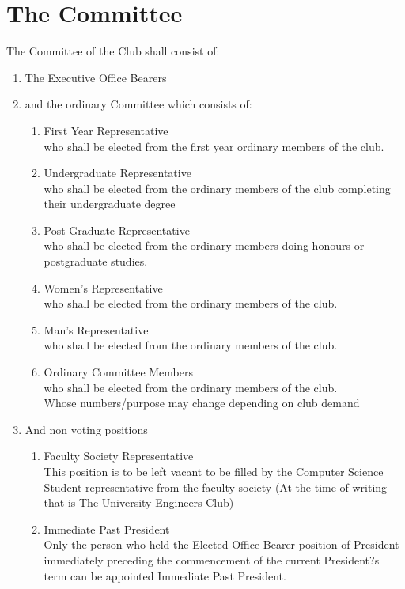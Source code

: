 \documentclass[10pt,a4paper]{report}
\begin{document}
	\section{The Committee}
	The Committee of the Club shall consist of: 
	\begin{enumerate}[label=\alph*]
		\item The Executive Office Bearers
		\item and the ordinary Committee which consists of:
		\begin{enumerate}[label=\roman*]
			\item First Year Representative\\
			who shall be elected from the first year ordinary members of the club.
			\item Undergraduate Representative\\
			who shall be elected from the ordinary members of the club completing their undergraduate degree
			\item Post Graduate Representative\\
			who shall be elected from the ordinary members doing honours or postgraduate studies.
			\item Women's Representative\\
			who shall be elected from the ordinary members of the club.
			\item Man's Representative\\
			who shall be elected from the ordinary members of the club.
			\item Ordinary Committee Members\\
			who shall be elected from the ordinary members of the club.\\
			Whose numbers/purpose may change depending on club demand
		\end{enumerate}
		\item And non voting positions
		\begin{enumerate}
			\item Faculty Society Representative\\
			This position is to be left vacant to be filled by the Computer Science Student representative from the faculty society (At the time of writing that is The University Engineers Club)
			\item Immediate Past President\\
			Only the person who held the Elected Office Bearer position of President immediately preceding the commencement of the current President?s term can be appointed Immediate Past President.
		\end{enumerate}
	\end{enumerate}
\end{document}
